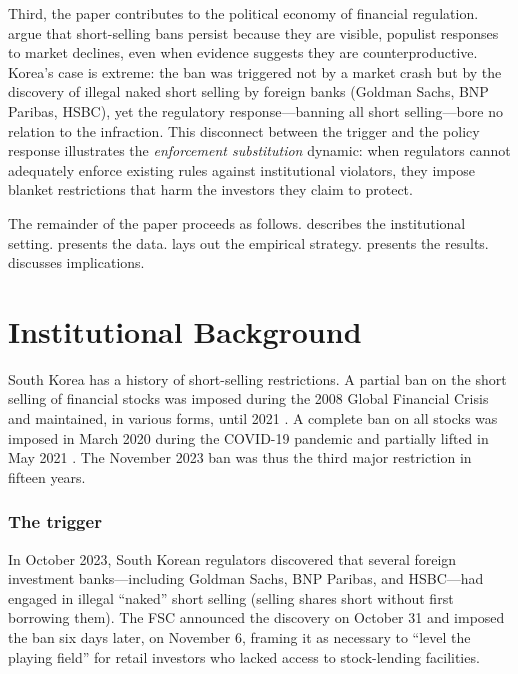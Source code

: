 \documentclass[12pt]{article}
\begin{document}
Third, the paper contributes to the political economy of financial regulation. \citet{enriques2014extraordinary} argue that short-selling bans persist because they are visible, populist responses to market declines, even when evidence suggests they are counterproductive. Korea's case is extreme: the ban was triggered not by a market crash but by the discovery of illegal naked short selling by foreign banks (Goldman Sachs, BNP Paribas, HSBC), yet the regulatory response---banning all short selling---bore no relation to the infraction. This disconnect between the trigger and the policy response illustrates the \textit{enforcement substitution} dynamic: when regulators cannot adequately enforce existing rules against institutional violators, they impose blanket restrictions that harm the investors they claim to protect.

The remainder of the paper proceeds as follows.  describes the institutional setting.  presents the data.  lays out the empirical strategy.  presents the results.  discusses implications.


\section{Institutional Background}
\label{sec:background}

South Korea has a history of short-selling restrictions. A partial ban on the short selling of financial stocks was imposed during the 2008 Global Financial Crisis and maintained, in various forms, until 2021 \citep{beber2013short}. A complete ban on all stocks was imposed in March 2020 during the COVID-19 pandemic and partially lifted in May 2021 \citep{oecd2021short}. The November 2023 ban was thus the third major restriction in fifteen years.

\subsubsection*{The trigger} In October 2023, South Korean regulators discovered that several foreign investment banks---including Goldman Sachs, BNP Paribas, and HSBC---had engaged in illegal ``naked'' short selling (selling shares short without first borrowing them). The FSC announced the discovery on October 31 and imposed the ban six days later, on November 6, framing it as necessary to ``level the playing field'' for retail investors who lacked access to stock-lending facilities.
\end{document}
